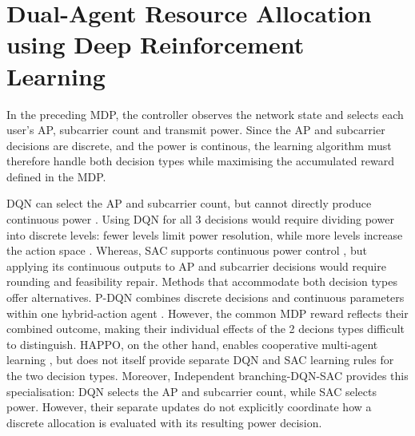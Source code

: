 \documentclass[journal]{IEEEtran}
\begin{document}
\section{Dual-Agent Resource Allocation using Deep
Reinforcement Learning}
\label{sec:farad_rl}

In the preceding MDP, the controller observes the network state and selects each user's AP, subcarrier count and transmit power. Since the AP and subcarrier decisions are discrete, and the power is continous, the learning algorithm must therefore handle both decision types while maximising the accumulated reward defined in the MDP.

DQN can select the AP and subcarrier count, but cannot directly produce continuous power \cite{Mnih2015DQN}. Using DQN for all 3 decisions would require dividing power into discrete levels: fewer levels limit power resolution, while more levels increase
the action space \cite{Tavakoli2018Branching}. Whereas, SAC supports continuous power control \cite{Haarnoja2018SAC}, but applying its continuous outputs to AP and subcarrier decisions would require rounding and feasibility
repair. Methods that accommodate both decision types offer alternatives.
P-DQN combines discrete decisions and continuous parameters within
one hybrid-action agent \cite{Xiong2018PDQN}. However, the common
MDP reward reflects their combined outcome, making their individual
effects of the 2 decions types difficult to distinguish. HAPPO, on the other hand, enables cooperative multi-agent learning \cite{Kuba2022HAPPO}, but does not itself
provide separate DQN and SAC learning rules for the two decision types. Moreover, Independent branching-DQN-SAC \cite{Tavakoli2018Branching,Haarnoja2018SAC} provides this specialisation:
DQN selects the AP and subcarrier count, while SAC selects power.
However, their separate updates do not explicitly coordinate
how a discrete allocation is evaluated with its resulting power
decision.
\end{document}
